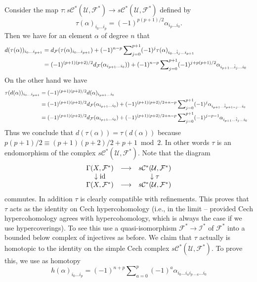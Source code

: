 \medskip\noindent
Consider the map $\tau : s{\mathcal C}^*({\mathcal U},{\mathcal F}^*) \to
s{\mathcal C}^*({\mathcal U},{\mathcal F}^*)$ defined by
$$
\tau(\alpha)_{i_0\ldots i_p} = (-1)^{p(p+1)/2} \alpha_{i_p\ldots i_0}.
$$
Then we have for an element $\alpha$ of degree $n$ that
\begin{align*}
d(\tau(\alpha))_{i_0\ldots i_{p+1}}
& =
d_{\mathcal F}(\tau(\alpha)_{i_0\ldots i_{p+1}})
+
(-1)^{n-p}
\sum\nolimits_{j=0}^{p+1}
(-1)^j
\tau(\alpha)_{i_0\ldots \hat i_j\ldots i_{p+1}}
\cr
& =
(-1)^{(p+1)(p+2)/2}
d_{\mathcal F}(\alpha_{i_{p+1}\ldots i_0}))
+
(-1)^{n-p}
\sum\nolimits_{j=0}^{p+1}
(-1)^{j+p(p+1)/2}
\alpha_{i_{p+1}\ldots \hat i_j\ldots i_0}
\end{align*}
On the other hand we have
\begin{align*}
\tau(d(\alpha))_{i_0\ldots i_{p+1}}
& =
(-1)^{(p+1)(p+2)/2} d(\alpha)_{i_{p+1}\ldots i_0} 
\cr
& =
(-1)^{(p+1)(p+2)/2}
d_{\mathcal F}(\alpha_{i_{p+1}\ldots i_0})
+
(-1)^{(p+1)(p+2)/2+n-p}
\sum\nolimits_{j=0}^{p+1}
(-1)^j
\alpha_{i_{p+1}\ldots \hat i_{p+1-j}\ldots i_0}
\cr
& =
(-1)^{(p+1)(p+2)/2}
d_{\mathcal F}(\alpha_{i_{p+1}\ldots i_0})
+
(-1)^{(p+1)(p+2)/2+n-p}
\sum\nolimits_{j=0}^{p+1}
(-1)^{j-p-1}
\alpha_{i_{p+1}\ldots \hat i_j\ldots i_0}
\end{align*}
Thus we conclude that $d(\tau(\alpha))=\tau(d(\alpha))$
because $p(p+1)/2 \equiv (p+1)(p+2)/2+p+1 \bmod 2$. In other words
$\tau$ is an endomorphism of the complex
$s{\mathcal C}^*({\mathcal U},{\mathcal F}^*)$. Note that the diagram
$$
\begin{matrix}
\Gamma(X,{\mathcal F}^*) &
\longrightarrow &
s{\mathcal C}^*({\mathcal U},{\mathcal F}^*) \cr
\downarrow {\rm id} & & \downarrow \tau \cr
\Gamma(X,{\mathcal F}^*) &
\longrightarrow &
s{\mathcal C}^*({\mathcal U},{\mathcal F}^*) \cr
\end{matrix}
$$
commutes. In addition $\tau$ is clearly compatible with refinements.
This proves that $\tau$ acts as the identity on Cech hypercohomology
(i.e., in the limit -- provided Cech hypercohomology agrees with
hypercohomology, which is always the case if we use hypercoverings).
To see this use a quasi-isomorphism ${\mathcal F}^* \to {\mathcal I}^*$ of
${\mathcal F}^*$ into a bounded below complex of injectives as before.
We claim that $\tau$ actually is homotopic to the identity on the
simple Cech complex $s{\mathcal C}^*({\mathcal U}, {\mathcal F}^*)$.
To prove this, we use as homotopy
$$
h(\alpha)_{i_0\ldots i_p}
=
(-1)^{n+p}
\sum\nolimits_{a=0}^{p}
(-1)^a
\alpha_{i_0\ldots i_a i_{p-a} \ldots i_0}
$$
